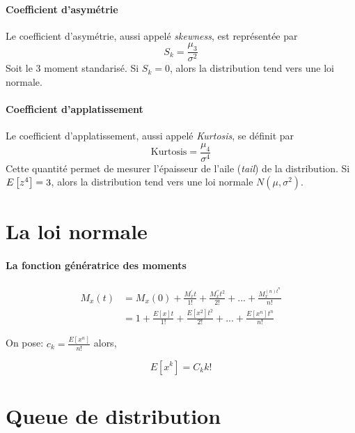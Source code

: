 \documentclass[12pt, french]{report}
\begin{document}
\paragraph{Coefficient d'asymétrie}
Le coefficient d'asymétrie, aussi appelé \textit{skewness}, est représentée par
\begin{equation}
S_k = \frac{\mu_3}{\sigma^2}
\end{equation}
Soit le 3 moment standarisé. Si $S_k = 0$, alors la distribution tend vers une loi normale.

\paragraph{Coefficient d'applatissement}
Le coefficient d'applatissement, aussi appelé \textit{Kurtosis}, se définit par
\begin{equation}
\text{Kurtosis} = \frac{\mu_4}{\sigma^4}
\end{equation}
Cette quantité permet de mesurer l'épaisseur de l'aile (\textit{tail}) de la distribution. Si $E \left[ z^4 \right] =3$, alors la distribution tend vers une loi normale $N(\mu, \sigma^2)$.

\section{La loi normale}

\paragraph{La fonction génératrice des moments}
\begin{align*}
    M_x(t) &= M_x(0) + \frac{M_x^\prime t}{1!} + \frac{M_x^{\prime\prime} t^2}{2!} + ... + \frac{M_x^{(n) t^n}}{n!} \\
           &= 1 + \frac{E[x] t}{1!} + \frac{E[x^2] t^2}{2!} + ... + \frac{E[x^n] t^n}{n!}
\end{align*}

On pose: $c_k = \frac{E[x^n]}{n!}$ alors,

\begin{equation}
    E[x^k] = C_k k!
\end{equation}

\section{Queue de distribution}
\end{document}

